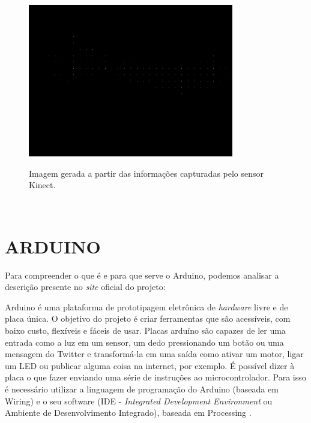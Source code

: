 \begin{figure}[H]
    \centering
    \caption{Imagem gerada a partir  das informações capturadas  pelo sensor Kinect.}
	\vspace*{0,2cm}
    \includegraphics[width=0.8\textwidth]{./04-figuras/kinect_exemplo}
    \label{fig:kinect_exemplo}
\end{figure}
\vspace*{-0,9cm}
{\raggedright {}}\\


\section{ARDUINO}

Para compreender o que é e para que serve o Arduino, podemos analisar a descrição presente no \textit{site} oficial do projeto:

\begin{citacao}
Arduino é uma plataforma de prototipagem eletrônica de \textit{hardware} livre e de placa única. O objetivo do projeto é criar ferramentas que são acessíveis, com baixo custo, flexíveis e fáceis de usar. Placas arduíno são capazes de ler uma entrada como a luz em um sensor, um dedo pressionando um botão ou uma mensagem do Twitter e transformá-la em uma saída como ativar um motor, ligar um LED ou publicar alguma coisa na internet, por exemplo. É possível dizer à placa o que fazer enviando uma série de instruções ao microcontrolador. Para isso é necessário utilizar a linguagem de programação do Arduino (baseada em Wiring) e o seu software (IDE - \textit{Integrated Development Environment} ou Ambiente de Desenvolvimento Integrado), baseada em Processing \cite{arduino}. 
\end{citacao}

